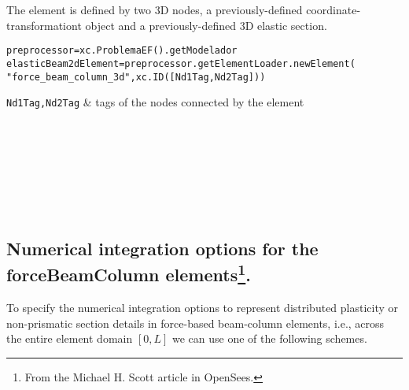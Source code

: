 The element is defined by two 3D nodes, a previously-defined coordinate-transformationt object and a previously-defined 3D elastic section.
\begin{verbatim}
preprocessor=xc.ProblemaEF().getModelador
elasticBeam2dElement=preprocessor.getElementLoader.newElement(
"force_beam_column_3d",xc.ID([Nd1Tag,Nd2Tag]))
\end{verbatim}
\begin{paramFuncTable}
{\tt Nd1Tag,Nd2Tag} & tags of the nodes connected by the element\\
\end{paramFuncTable}
\begin{paramClassTable}
\ElementParam{}
\ElementOneDParam{}
\rhoX{}
\end{paramClassTable}

\begin{methodsTable}
\ElementMeth{}
\ElementOneDMeth{}
\BeamColumnWithSectionFDMeth{}
\getVDirEjeFuerteLocales{} \\
\getVDirEjeDebilLocales{} \\
\getAnguloEjeFuerte{} \\
\getAnguloEjeDebil{} \\
\getVDirEjeFuerteGlobales{} \\
\getVDirEjeDebilGlobales{} \\
\end{methodsTable}

\subsection{Numerical integration options for the forceBeamColumn elements\footnote{From the Michael H. Scott article in OpenSees.}.}

To specify the numerical integration options to represent distributed plasticity or non-prismatic section details in force-based beam-column elements, i.e., across the entire element domain $[0, L]$ we can use one of the following schemes.
